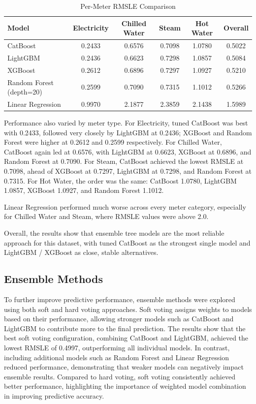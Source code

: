 \documentclass{article}
\begin{document}
\begin{table}[h]
\centering
\label{tab:meter_comparison}
\begin{tabular}{|l|c|c|c|c|c|}
\hline
\textbf{Model} & \textbf{Electricity} & \textbf{Chilled Water} & \textbf{Steam} & \textbf{Hot Water} & \textbf{Overall} \\
\hline
CatBoost & 0.2433 & 0.6576 & 0.7098 & 1.0780 & 0.5022 \\
LightGBM & 0.2436 & 0.6623 & 0.7298 & 1.0857 & 0.5084 \\
XGBoost & 0.2612 & 0.6896 & 0.7297 & 1.0927 & 0.5210 \\
Random Forest (depth=20) & 0.2599 & 0.7090 & 0.7315 & 1.1012 & 0.5266 \\
Linear Regression & 0.9970 & 2.1877 & 2.3859 & 2.1438 & 1.5989 \\
\hline
\end{tabular}
\caption{Per-Meter RMSLE Comparison}
\end{table}


Performance also varied by meter type. For Electricity, tuned CatBoost was best with 0.2433, followed very closely by LightGBM at 0.2436; XGBoost and Random Forest were higher at 0.2612 and 0.2599 respectively. For Chilled Water, CatBoost again led at 0.6576, with LightGBM at 0.6623, XGBoost at 0.6896, and Random Forest at 0.7090. For Steam, CatBoost achieved the lowest RMSLE at 0.7098, ahead of XGBoost at 0.7297, LightGBM at 0.7298, and Random Forest at 0.7315. For Hot Water, the order was the same: CatBoost 1.0780, LightGBM 1.0857, XGBoost 1.0927, and Random Forest 1.1012.

Linear Regression performed much worse across every meter category, especially for Chilled Water and Steam, where RMSLE values were above 2.0.

Overall, the results show that ensemble tree models are the most reliable approach for this dataset, with tuned CatBoost as the strongest single model and LightGBM / XGBoost as close, stable alternatives.


\subsection{Ensemble Methods}
To further improve predictive performance, ensemble methods were explored using both soft and hard voting approaches. Soft voting assigns weights to models based on their performance, allowing stronger models such as CatBoost and LightGBM to contribute more to the final prediction.
The results show that the best soft voting configuration, combining CatBoost and LightGBM, achieved the lowest RMSLE of 0.4997, outperforming all individual models. In contrast, including additional models such as Random Forest and Linear Regression reduced performance, demonstrating that weaker models can negatively impact ensemble results.
Compared to hard voting, soft voting consistently achieved better performance, highlighting the importance of weighted model combination in improving predictive accuracy.
\end{document}
